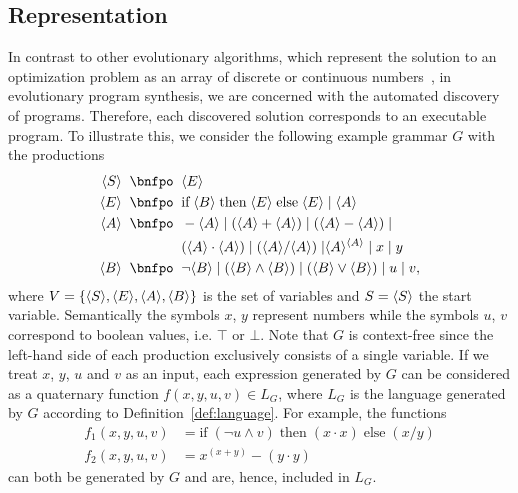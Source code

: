\subsection{Representation}\label{sec:gggp-representation}
In contrast to other evolutionary algorithms, which represent the solution to an optimization problem as an array of discrete or continuous numbers~\cite{back1997handbook}, in evolutionary program synthesis, we are concerned with the automated discovery of programs. Therefore, each discovered solution corresponds to an executable program.
To illustrate this, we consider the following example grammar $G$ with the productions
\begin{equation}
	\begin{split}
		\ps S \; \; \bnfpo & \; \; \ps E \\
		\ps E \; \; \bnfpo & \; \; \text{if} \; \ps B \; \text{then} \; \ps E \; \text{else} \; \ps E \; | \; \ps A \\
		\ps A \; \; \bnfpo & \; \; -\ps A \; | \; (\ps A + \ps A) \; | \; (\ps A - \ps A) \; | \\
		 & \; \; (\ps A \cdot \ps A) \; | \; (\ps A / \ps A) \; | \ps{A}^{\ps{A}} \; | \; x \; | \; y \\  
		\ps B \; \; \bnfpo & \; \;  \neg \ps B \; | \; (\ps B \wedge \ps B) \; | \; (\ps B \vee \ps B) \; | \; u \; | \; v,
	\end{split}
\label{eq:gp-example-grammar}
\end{equation}
where $V = \{\langle S \rangle, \langle E \rangle, \langle A \rangle, \langle B \rangle\}$ is the set of variables and $S = \langle S \rangle$ the start variable.
Semantically the symbols $x$, $y$ represent numbers while the symbols $u$, $v$ correspond to boolean values, i.e. $\top$ or $\bot$.
Note that $G$ is context-free since the left-hand side of each production exclusively consists of a single variable.
If we treat $x$, $y$, $u$ and $v$ as an input, each expression generated by $G$ can be considered as a quaternary function $f(x,y,u,v) \in L_{G}$, where $L_G$ is the language generated by $G$ according to Definition~\ref{def:language}.
For example, the functions
\begin{equation}
	\begin{split}
		f_1(x,y,u,v) & = \text{if} \; (\neg u \wedge v) \; \text{then} \; (x \cdot x) \; \text{else} \; (x / y) \\
		f_2(x,y,u,v) & = x^{(x + y)} - (y \cdot y)
	\end{split}
\label{eq:gp-example-functions}
\end{equation} can both be generated by $G$ and are, hence, included in $L_G$.
